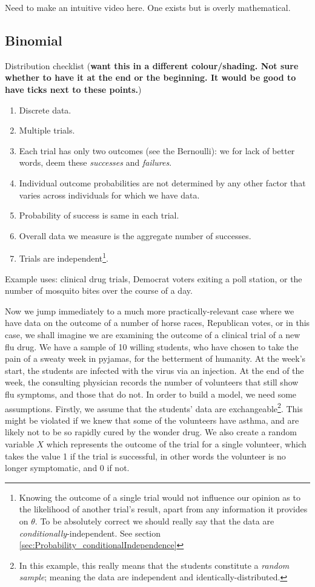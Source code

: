 \documentclass[11pt,fullpage]{book}
\begin{document}
 Need to make an intuitive video here. One exists but is overly mathematical.

\subsection{Binomial}
Distribution checklist (\textbf{want this in a different colour/shading. Not sure whether to have it at the end or the beginning. It would be good to have ticks next to these points.})

\begin{enumerate} 
\item Discrete data.
\item Multiple trials.
\item Each trial has only two outcomes (see the Bernoulli): we for lack of better words, deem these \textit{successes} and \textit{failures}.
\item Individual outcome probabilities are not determined by any other factor that varies across individuals for which we have data.
\item Probability of success is same in each trial.
\item Overall data we measure is the aggregate number of successes. 
\item Trials are independent\footnote{Knowing the outcome of a single trial would not influence our opinion as to the likelihood of another trial's result, apart from any information it provides on $\theta$. To be absolutely correct we should really say that the data are \textit{conditionally}-independent. See section \ref{sec:Probability_conditionalIndependence}}.
\end{enumerate}

Example uses: clinical drug trials, Democrat voters exiting a poll station, or the number of mosquito bites over the course of a day.

Now we jump immediately to a much more practically-relevant case where we have data on the outcome of a number of horse races, Republican votes, or in this case, we shall imagine we are examining the outcome of a clinical trial of a new flu drug. We have a sample of 10 willing students, who have chosen to take the pain of a sweaty week in pyjamas, for the betterment of humanity. At the week's start, the students are infected with the virus via an injection. At the end of the week, the consulting physician records the number of volunteers that still show flu symptoms, and those that do not. In order to build a model, we need some assumptions. Firstly, we assume that the students' data are exchangeable\footnote{In this example, this really means that the students constitute a \textit{random sample}; meaning the data are independent and identically-distributed.}. This might be violated if we knew that some of the volunteers have asthma, and are likely not to be so rapidly cured by the wonder drug. We also create a random variable $X$ which represents the outcome of the trial for a single volunteer, which takes the value 1 if the trial is successful, in other words the volunteer is no longer symptomatic, and 0 if not.
\end{document}
